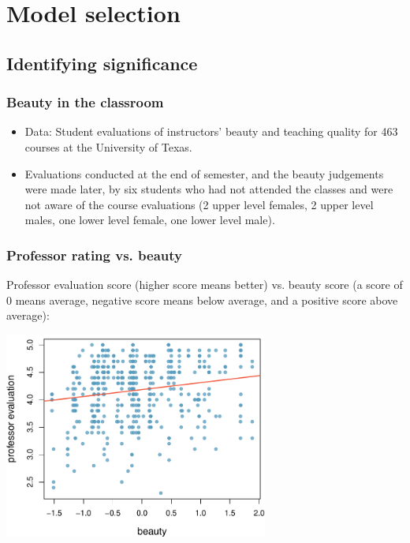 \section{Model selection}


\subsection{Identifying significance}


\begin{frame}
\frametitle{Beauty in the classroom}

\begin{itemize}

\item Data: Student evaluations of instructors' beauty and teaching quality for 463 courses at the University of Texas.

\item Evaluations conducted at the end of semester, and the beauty judgements were made later, by six students who had not attended the classes and were not aware of the course evaluations (2 upper level females, 2 upper level males, one lower level female, one lower level male).

\end{itemize}


\end{frame}


\begin{frame}
\frametitle{Professor rating vs. beauty}

Professor evaluation score (higher score means better) vs. beauty score (a score of 0 means average, negative score means below average, and a positive score above average):

\begin{center}
\includegraphics[width=0.65\textwidth]{8-2_model_select/figures/beauty/beauty_profeval}
\end{center}

\end{frame}

